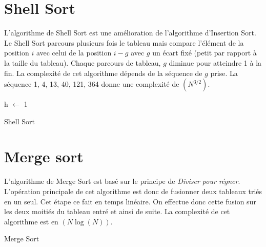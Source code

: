 \section{Shell Sort}
L'algorithme de Shell Sort est une amélioration de l'algorithme d'Insertion Sort. Le Shell Sort parcours plusieurs fois le tableau mais compare l'élément de la position $i$ avec celui de la position $i-g$ avec $g$ un écart fixé (petit par rapport à la taille du tableau). Chaque parcours de tableau, $g$ diminue pour atteindre 1 à la fin. La complexité de cet algorithme dépends de la séquence de $g$ prise. La séquence 1, 4, 13, 40, 121, 364 donne une complexité de \bigO $(N^{3/2})$. 
\begin{algorithm}
 \SetAlgoLined
 h $\leftarrow$ 1\\
 \caption{Shell Sort}
\end{algorithm}
\section{Merge sort}
L'algorithme de Merge Sort est basé sur le principe de \emph{Diviser pour régner}. L'opération principale de cet algorithme est donc de fusionner deux tableaux triés en un seul. Cet étape ce fait en temps linéaire. On effectue donc cette fusion sur les deux moitiés du tableau entré et ainsi de suite. La complexité de cet algorithme est en \bigO $(N\log(N))$. 
\begin{algorithm}
 \SetAlgoLined
 \caption{Merge Sort}
\end{algorithm}
\newpage
